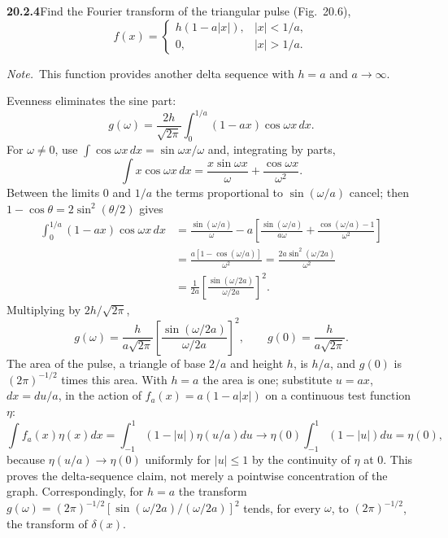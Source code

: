 \par\bigskip
\noindent\textbf{20.2.4}\quad Find the Fourier transform of the
triangular pulse (Fig.~20.6),
\[
f(x)=\begin{cases}
h(1-a|x|), & |x| < 1/a,\\
0, & |x| > 1/a.
\end{cases}
\]
\par\emph{Note.}~This function provides another delta sequence
with $h=a$ and $a\to\infty$.
\par{}
\solution
{} Evenness eliminates the sine part:
\[
g(\omega)=\frac{2h}{\sqrt{2\pi}}
\int_0^{1/a}(1-ax)\cos\omega x\,dx.
\]
For $\omega\ne0$, use $\int\cos\omega x\,dx=\sin\omega x/\omega$
and, integrating by parts,
\[
\int x\cos\omega x\,dx
=\frac{x\sin\omega x}{\omega}+\frac{\cos\omega x}{\omega^2}.
\]
Between the limits $0$ and $1/a$ the terms proportional to
$\sin(\omega/a)$ cancel; then $1-\cos\theta=2\sin^2(\theta/2)$ gives
\begin{align*}
\int_0^{1/a}(1-ax)\cos\omega x\,dx
&=\frac{\sin(\omega/a)}\omega-a\left[\frac{\sin(\omega/a)}{a\omega}
+\frac{\cos(\omega/a)-1}{\omega^2}\right]\\
&=\frac{a[1-\cos(\omega/a)]}{\omega^2}
=\frac{2a\sin^2(\omega/2a)}{\omega^2}\\
&=\frac1{2a}\left[\frac{\sin(\omega/2a)}{\omega/2a}\right]^2.
\end{align*}
Multiplying by $2h/\sqrt{2\pi}$,
\[
\boxed{g(\omega)=\frac{h}{a\sqrt{2\pi}}
\left[\frac{\sin(\omega/2a)}{\omega/2a}\right]^2},
\qquad g(0)=\frac{h}{a\sqrt{2\pi}}.
\]
The area of the pulse, a triangle of base $2/a$ and height $h$,
is $h/a$, and $g(0)$ is $(2\pi)^{-1/2}$ times this area. With
$h=a$ the area is one; substitute $u=ax$, $dx=du/a$, in the
action of $f_a(x)=a(1-a|x|)$ on a continuous test function $\eta$:
\[
\int f_a(x)\eta(x)dx=\int_{-1}^1(1-|u|)\eta(u/a)du
\longrightarrow\eta(0)\int_{-1}^1(1-|u|)du=\eta(0),
\]
because $\eta(u/a)\to\eta(0)$ uniformly for $|u|\le1$ by the
continuity of $\eta$ at $0$.
This proves the delta-sequence claim, not merely a pointwise
concentration of the graph. Correspondingly, for $h=a$ the
transform $g(\omega)=(2\pi)^{-1/2}[\sin(\omega/2a)/(\omega/2a)]^2$
tends, for every $\omega$, to $(2\pi)^{-1/2}$, the transform of
$\delta(x)$.

